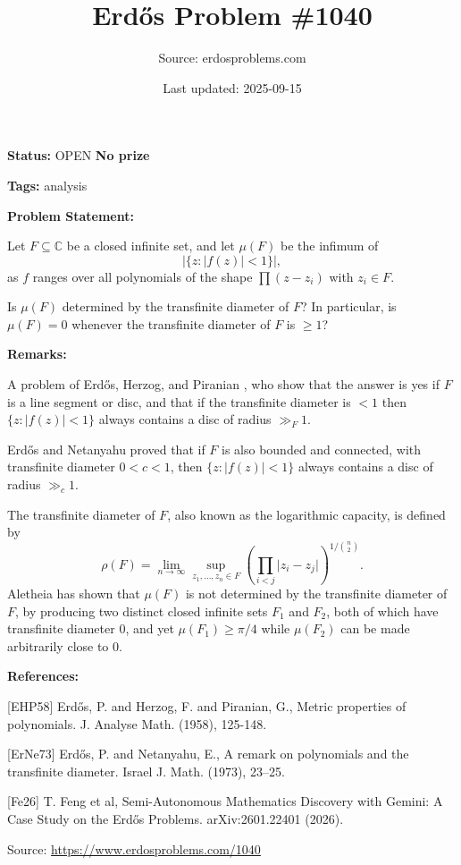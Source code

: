 \documentclass{article}
\title{Erd\H{o}s Problem \#1040}
\date{Last updated: 2025-09-15}
\author{Source: erdosproblems.com}
\begin{document}
\maketitle

\noindent\textbf{Status:} OPEN \quad \textbf{No prize}

\noindent\textbf{Tags:} analysis

\medskip
\noindent\textbf{Problem Statement:}

Let $F\subseteq \mathbb{C}$ be a closed infinite set, and let $\mu(F)$ be the infimum of\[\lvert \{ z: \lvert f(z)\rvert < 1\}\rvert,\]as $f$ ranges over all polynomials of the shape $\prod (z-z_i)$ with $z_i\in F$.

Is $\mu(F)$ determined by the transfinite diameter of $F$? In particular, is $\mu(F)=0$ whenever the transfinite diameter of $F$ is $\geq 1$?

\bigskip
\noindent\textbf{Remarks:}

A problem of Erd\H{o}s, Herzog, and Piranian \cite{EHP58}, who show that the answer is yes if $F$ is a line segment or disc, and that if the transfinite diameter is $<1$ then $\{ z: \lvert f(z)\rvert < 1\}$ always contains a disc of radius $\gg_F 1$.

Erd\H{o}s and Netanyahu \cite{ErNe73} proved that if $F$ is also bounded and connected, with transfinite diameter $0<c<1$, then $\{ z: \lvert f(z)\rvert < 1\}$ always contains a disc of radius $\gg_c 1$.

The transfinite diameter of $F$, also known as the logarithmic capacity, is defined by\[\rho(F)=\lim_{n\to \infty}\sup_{z_1,\ldots,z_n\in F}\left(\prod_{i<j}\lvert z_i-z_j\rvert\right)^{1/\binom{n}{2}}.\]Aletheia \cite{Fe26} has shown that $\mu(F)$ is not determined by the transfinite diameter of $F$, by producing two distinct closed infinite sets $F_1$ and $F_2$, both of which have transfinite diameter $0$, and yet $\mu(F_1)\geq \pi/4$ while $\mu(F_2)$ can be made arbitrarily close to $0$.

\bigskip
\noindent\textbf{References:}

[EHP58] Erd\H{o}s, P. and Herzog, F. and Piranian, G., Metric properties of polynomials. J. Analyse Math. (1958), 125-148.
 
 [ErNe73] Erd\H{o}s, P. and Netanyahu, E., A remark on polynomials and the transfinite diameter. Israel J. Math. (1973), 23--25.
 
 [Fe26] T. Feng et al, Semi-Autonomous Mathematics Discovery with Gemini: A Case Study on the Erd\H{o}s Problems. arXiv:2601.22401 (2026).

\bigskip
\noindent\small{Source: \url{https://www.erdosproblems.com/1040}}
\end{document}
